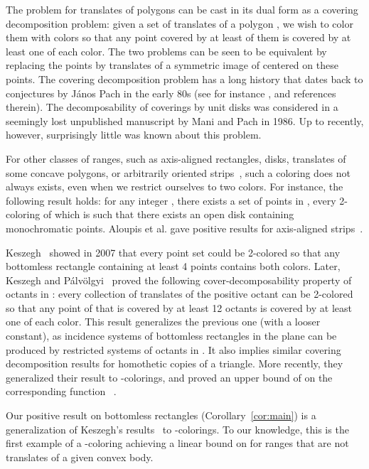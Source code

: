 \documentclass[11pt,a4paper]{amsart}
\theoremstyle{plain}
\theoremstyle{definition}
\begin{document}
The problem for translates of polygons can be cast in its dual form as a covering decomposition problem: given a set of translates of a polygon , we wish to
color them with  colors so that any point covered by at least  of them is covered by at least one of each color. The two problems can be seen to be equivalent 
by replacing the points by translates of a symmetric image of  centered on these points. The covering decomposition problem has a long history that dates back to conjectures by J\'anos Pach in the early 80s (see for instance \cite{P86,DG}, and references therein). The decomposability of coverings by unit disks was considered in a seemingly lost unpublished manuscript by Mani and Pach in 1986. Up to recently, however, surprisingly little was known about this problem. 

For other classes of ranges, such as axis-aligned rectangles, disks, translates of some concave polygons, or arbitrarily oriented strips~\cite{CPST09,PT10b,PTT05, P10}, such a coloring does not always exists, even when we restrict ourselves to two colors. For instance, the following result holds: for any integer , there exists a set of points in , every 2-coloring of which is such that there exists an open disk containing  monochromatic points. Aloupis et al. gave positive results for axis-aligned strips~\cite{ACCIKLSST11}.

Keszegh~\cite{K07} showed in 2007 that every point set could be 2-colored so that any bottomless rectangle containing at least 4 points contains both colors. Later, Keszegh and P\'alv\"olgyi~\cite{KP11} proved the following cover-decomposability property of octants in : every collection of translates of the positive octant can be 2-colored so that any point of  that is covered by at least 12 octants is covered by at least one of each color. This result generalizes the previous one (with a looser constant), as incidence systems of bottomless rectangles in the plane can be produced by restricted systems of octants in . It also implies similar covering decomposition results for homothetic copies of a triangle. More recently, they generalized their result to -colorings, and proved an upper bound of  on the corresponding function ~\cite{KP12}. 

Our positive result on bottomless rectangles (Corollary~\ref{cor:main}) is a generalization of Keszegh's results~\cite{K07} to -colorings. To our knowledge, this is the first example of a -coloring achieving a linear bound on  for ranges that are not translates of a given convex body.
\end{document}
